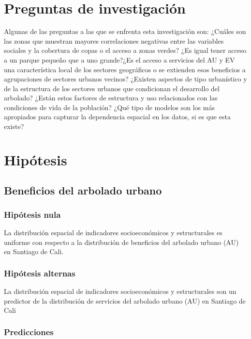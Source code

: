 \documentclass[12pt,]{book}
\begin{document}
\section{Preguntas de investigación}\label{preguntas-de-investigacion}

Algunas de las preguntas a las que se enfrenta esta investigación son:
¿Cuáles son las zonas que muestran mayores correlaciones negativas entre
las variables sociales y la cobertura de copas o el acceso a zonas
verdes? ¿Es igual tener acceso a un parque pequeño que a uno grande?¿Es
el acceso a servicios del AU y EV una característica local de los
sectores geográficos o se extienden esos beneficios a agrupaciones de
sectores urbanos vecinos? ¿Existen aspectos de tipo urbanístico y de la
estructura de los sectores urbanos que condicionan el desarrollo del
arbolado? ¿Están estos factores de estructura y uso relacionados con las
condiciones de vida de la población? ¿Qué tipo de modelos son los más
apropiados para capturar la dependencia espacial en los datos, si es que
esta existe?

\section{Hipótesis}\label{hipotesis}

\subsection{Beneficios del arbolado
urbano}\label{beneficios-del-arbolado-urbano}

\subsubsection{Hipótesis nula}\label{hipotesis-nula}

La distribución espacial de indicadores socioeconómicos y estructurales
es uniforme con respecto a la distribución de beneficios del arbolado
urbano (AU) en Santiago de Cali.

\subsubsection{Hipótesis alternas}\label{hipotesis-alternas}

La distribución espacial de indicadores socioeconómicos y estructurales
son un predictor de la distribución de servicios del arbolado urbano
(AU) en Santiago de Cali

\subsubsection{Predicciones}\label{predicciones}
\end{document}
